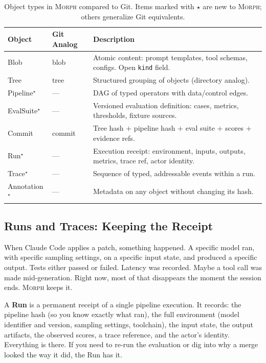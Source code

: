 \documentclass{article}
\begin{document}
\begin{table}[t]
\centering
\caption{Object types in \textsc{Morph} compared to Git. Items marked with
$\star$ are new to \textsc{Morph}; others generalize Git equivalents.}
\label{tab:objects}
\begin{tabular}{@{}llp{6.5cm}@{}}
\toprule
\textbf{Object} & \textbf{Git Analog} & \textbf{Description} \\
\midrule
Blob & blob & Atomic content: prompt templates, tool schemas, configs. Open
  \texttt{kind} field. \\
Tree & tree & Structured grouping of objects (directory analog). \\
Pipeline$^\star$ & --- & DAG of typed operators with data/control edges. \\
EvalSuite$^\star$ & --- & Versioned evaluation definition: cases, metrics,
  thresholds, fixture sources. \\
Commit & commit & Tree hash $+$ pipeline hash $+$ eval suite $+$ scores
  $+$ evidence refs. \\
Run$^\star$ & --- & Execution receipt: environment, inputs, outputs, metrics,
  trace ref, actor identity. \\
Trace$^\star$ & --- & Sequence of typed, addressable events within a run. \\
Annotation$^\star$ & --- & Metadata on any object without changing its hash. \\
\bottomrule
\end{tabular}
\end{table}

\subsection{Runs and Traces: Keeping the Receipt}

When Claude Code applies a patch, something happened. A specific model ran, with
specific sampling settings, on a specific input state, and produced a specific
output. Tests either passed or failed. Latency was recorded. Maybe a tool call
was made mid-generation. Right now, most of that disappears the moment the
session ends. \textsc{Morph} keeps it.

A \textbf{Run} is a permanent receipt of a single pipeline execution. It
records: the pipeline hash (so you know exactly what ran), the full environment
(model identifier and version, sampling settings, toolchain), the input state,
the output artifacts, the observed scores, a trace reference, and the actor's
identity. Everything is there. If you need to re-run the evaluation or dig
into why a merge looked the way it did, the Run has it.
\end{document}
